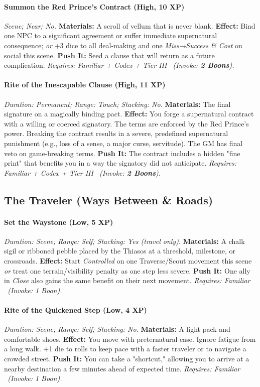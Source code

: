 \documentclass[12pt,twoside]{book}
\begin{document}
\paragraph{Summon the Red Prince’s Contract (High, 10 XP)} \emph{Scene; Near; No.}
\textbf{Materials:} A scroll of vellum that is never blank.
\textbf{Effect:} Bind one NPC to a significant agreement or suffer immediate supernatural consequence; \emph{or} +3 dice to all deal-making and one \emph{Miss→Success \& Cost} on social this scene.
\textbf{Push It:} Seed a clause that will return as a future complication.
\emph{Requires: Familiar + Codex + Tier III \ (\textit{Invoke:} \textbf{2 Boons}).}
\paragraph{Rite of the Inescapable Clause (High, 11 XP)} \emph{Duration: Permanent; Range: Touch; Stacking: No.}
\textbf{Materials:} The final signature on a magically binding pact.
\textbf{Effect:} You forge a supernatural contract with a willing or coerced signatory. The terms are enforced by the Red Prince's power. Breaking the contract results in a severe, predefined supernatural punishment (e.g., loss of a sense, a major curse, servitude). The GM has final veto on game-breaking terms.
\textbf{Push It:} The contract includes a hidden "fine print" that benefits you in a way the signatory did not anticipate.
\emph{Requires: Familiar + Codex + Tier III \ (\textit{Invoke:} \textbf{2 Boons}).}

\subsection{The Traveler (Ways Between \& Roads)}
\paragraph{Set the Waystone (Low, 5 XP)} \emph{Duration: Scene; Range: Self; Stacking: Yes (travel only).}
\textbf{Materials:} A chalk sigil or ribboned pebble placed by the Thiasos at a threshold, milestone, or crossroads.
\textbf{Effect:} Start \emph{Controlled} on one Traverse/Scout movement this scene \emph{or} treat one terrain/visibility penalty as one step less severe.
\textbf{Push It:} One ally in \emph{Close} also gains the same benefit on their next movement.
\emph{Requires: Familiar \ (\textit{Invoke:} 1 Boon).}
\paragraph{Rite of the Quickened Step (Low, 4 XP)} \emph{Duration: Scene; Range: Self; Stacking: No.}
\textbf{Materials:} A light pack and comfortable shoes.
\textbf{Effect:} You move with preternatural ease. Ignore fatigue from a long walk. +1 die to rolls to keep pace with a faster traveler or to navigate a crowded street.
\textbf{Push It:} You can take a "shortcut," allowing you to arrive at a nearby destination a few minutes ahead of expected time.
\emph{Requires: Familiar \ (\textit{Invoke:} 1 Boon).}
\end{document}
